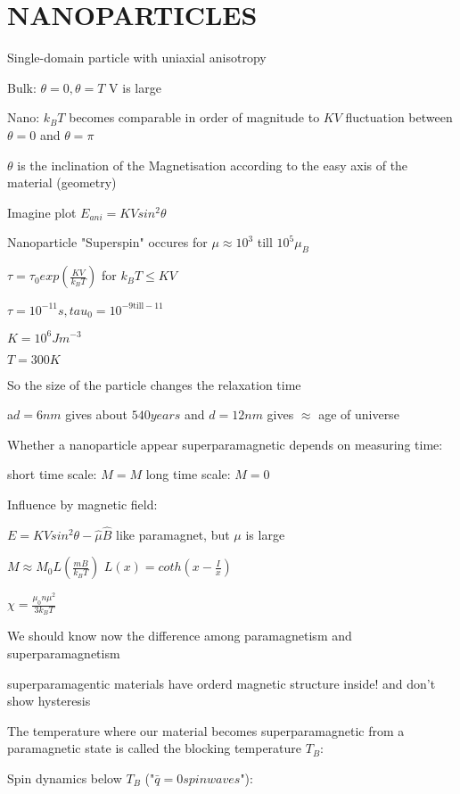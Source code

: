 \chapter{NANOPARTICLES}
Single-domain particle with uniaxial anisotropy 

Bulk: $\theta =0, \theta = T$ V is large

Nano:  $k_B T$ becomes comparable in order of magnitude to $K V$
fluctuation between $\theta = 0$ and $\theta = \pi$

$\theta$ is the inclination of the Magnetisation according to the easy axis of the material (geometry)

Imagine plot $E_{ani} = KVsin^2\theta$

Nanoparticle "Superspin" occures for $\mu \approx 10^3$ till $10^5 \mu_B$

$\tau	= \tau_0 exp(\frac{KV}{k_BT})$ for $k_BT \leq KV$

$\tau = 10^{-11}s, tau_0 = 10^{-9 \text{till} -11}$

$K = 10^6 Jm^{-3}$

$T = 300K$

So the size of the particle changes the relaxation time

a$d = 6nm$ gives about $540years$ and $d = 12nm$ gives $\approx$ age of universe

Whether a nanoparticle appear superparamagnetic depends on measuring time:

short time scale: $ M  = M$
long time scale: $ M  = 0$

Influence by magnetic field:

$E = KVsin^2\theta - \hat{\mu} \hat{B}$
like paramagnet, but $\mu$ is large

$M  \approx M_0 L (\frac{mB}{k_BT})$
$L(x) = coth(x - \frac{I}{x})$

$\chi = \frac{\mu_0n\mu^2}{3k_BT}$

We should know now the difference among paramagnetism and superparamagnetism

superparamagentic materials have orderd magnetic structure inside! and don't show hysteresis

The temperature where our material becomes superparamagnetic from a paramagnetic state is called the blocking temperature $T_B$:

Spin dynamics below $T_B$ ("$\bar{q} = 0 spinwaves$"):



